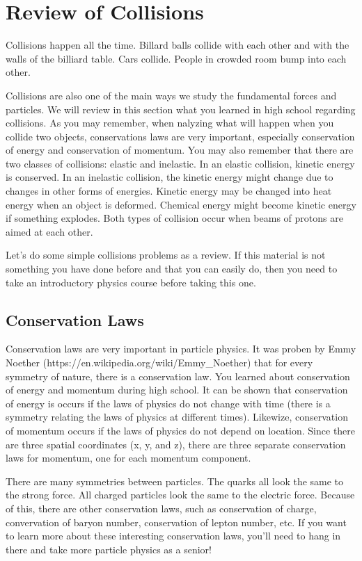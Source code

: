 \section{Review of Collisions}

Collisions happen all the time.  Billard balls collide with each other and with the walls of the billiard table.  Cars collide.  People in crowded room bump into each other.

Collisions are also one of the main ways we study the fundamental forces and particles.  We will review in this section what you learned in high school regarding collisions.  As you may remember, when nalyzing what will happen when you collide two objects, conservations laws are very important, especially conservation of energy and conservation of momentum.  You may also remember that there are two classes of collisions: elastic and inelastic.  In an elastic collision, kinetic energy is conserved.  In an inelastic collision, the kinetic energy might change due to changes in other forms of energies.  Kinetic energy may be changed into heat energy when an object is deformed.  Chemical energy might become kinetic energy if something explodes. Both types of collision occur when beams of protons are aimed at each other.

Let's do some simple collisions problems as a review.  If this material is not something you have done before and that you can easily do, then you need to take an introductory physics course before taking this one.

\subsection{Conservation Laws}
Conservation laws are very important in particle physics.  It was proben by Emmy Noether (https://en.wikipedia.org/wiki/Emmy\_Noether) that for every symmetry of nature, there is a conservation law.  You learned about conservation of energy and momentum during high school.  It can be shown that conservation of energy is occurs if the laws of physics do not change with time (there is a symmetry relating the laws of physics at different times).  Likewize, conservation of momentum occurs if the laws of physics do not depend on location.  Since there are three spatial coordinates (x, y, and z), there are three separate conservation laws for momentum, one for each momentum component.

There are many symmetries between particles.  The quarks all look the same to the strong force.  All charged particles look the same to the electric force.  Because of this, there are other conservation laws, such as conservation of charge, convervation of baryon number, conservation of lepton number, etc.  If you want to learn more about these interesting conservation laws, you'll need to hang in there and take more particle physics as a senior! 

